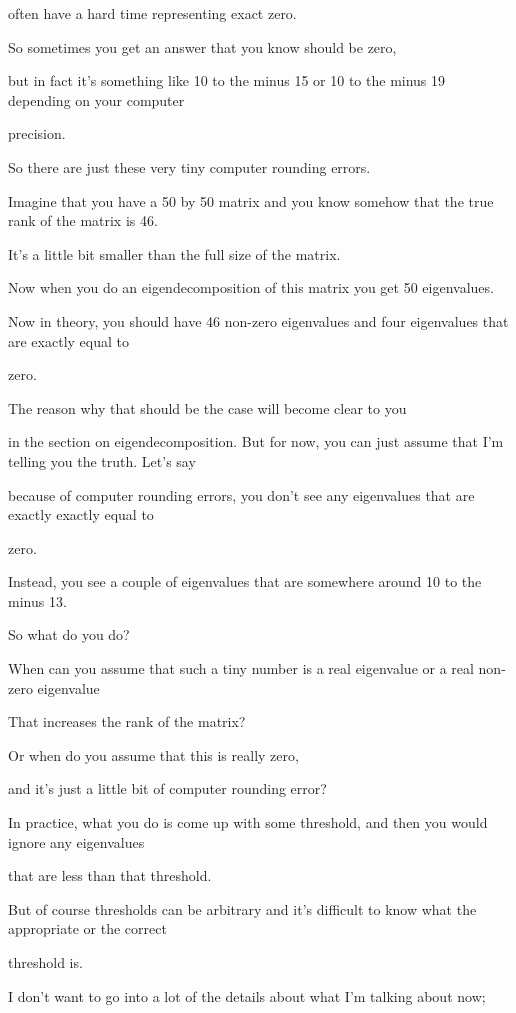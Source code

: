 \documentclass[fleqn,10pt]{olplainarticle}
\theoremstyle{definition}
\theoremstyle{remark}
\begin{document}
often have a hard time representing exact zero.

So sometimes you get an answer that you know should be zero,

but in fact it's something like 10 to the minus 15 or 10 to the minus 19 depending on your computer

precision.

So there are just these very tiny computer rounding errors.

Imagine that you have a 50 by 50 matrix and you know somehow that the true rank of the matrix is 46.

It's a little bit smaller than the full size of the matrix.

Now when you do an eigendecomposition of this matrix you get 50 eigenvalues.

Now in theory, you should have 46 non-zero eigenvalues and four eigenvalues that are exactly equal to

zero.

The reason why that should be the case will become clear to you

in the section on eigendecomposition. But for now, you can just assume that I'm telling you the truth. Let's say

because of computer rounding errors, you don't see any eigenvalues that are exactly exactly equal to

zero.

Instead, you see a couple of eigenvalues that are somewhere around 10 to the minus 13.

So what do you do?

When can you assume that such a tiny number is a real eigenvalue or a real non-zero eigenvalue

That increases the rank of the matrix?

Or when do you assume that this is really zero,

and it's just a little bit of computer rounding error?

In practice, what you do is come up with some threshold, and then you would ignore any eigenvalues

that are less than that threshold.

But of course thresholds can be arbitrary and it's difficult to know what the appropriate or the correct

threshold is.

I don't want to go into a lot of the details about what I'm talking about now;
\end{document}
